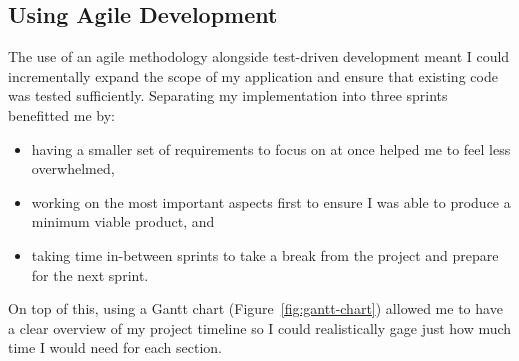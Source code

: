 
\subsection*{Using Agile Development}

The use of an agile methodology alongside test-driven development meant I could incrementally expand the scope of my application and ensure that existing code was tested sufficiently. Separating my implementation into three sprints benefitted me by:

\begin{itemize}
  \item having a smaller set of requirements to focus on at once helped me to feel less overwhelmed,
  \item working on the most important aspects first to ensure I was able to produce a minimum viable product, and
  \item taking time in-between sprints to take a break from the project and prepare for the next sprint.
\end{itemize}

\newparagraph
On top of this, using a Gantt chart (Figure~\ref{fig:gantt-chart}) allowed me to have a clear overview of my project timeline so I could realistically gage just how much time I would need for each section.